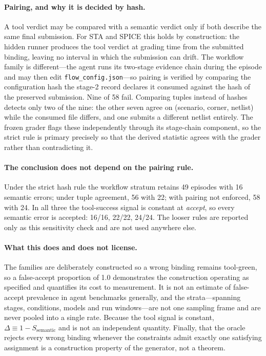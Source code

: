 \documentclass{article}
\begin{document}
\paragraph{Pairing, and why it is decided by hash.} A tool verdict may be compared with a semantic verdict only if both describe the same final submission. For STA and SPICE this holds by construction: the hidden runner produces the tool verdict at grading time from the submitted binding, leaving no interval in which the submission can drift. The workflow family is different---the agent runs its two-stage evidence chain during the episode and may then edit \texttt{flow\_config.json}---so pairing is verified by comparing the configuration hash the stage-2 record declares it consumed against the hash of the preserved submission. Nine of 58 fail. Comparing tuples instead of hashes detects only two of the nine: the other seven agree on (scenario, corner, netlist) while the consumed file differs, and one submits a different netlist entirely. The frozen grader flags these independently through its stage-chain component, so the strict rule is primary precisely so that the derived statistic agrees with the grader rather than contradicting it.

\paragraph{The conclusion does not depend on the pairing rule.} Under the strict hash rule the workflow stratum retains 49 episodes with 16 semantic errors; under tuple agreement, 56 with 22; with pairing not enforced, 58 with 24. In all three the tool-success signal is constant at \emph{accept}, so every semantic error is accepted: 16/16, 22/22, 24/24. The looser rules are reported only as this sensitivity check and are not used anywhere else.

\paragraph{What this does and does not license.} The families are deliberately constructed so a wrong binding remains tool-green, so a false-accept proportion of 1.0 demonstrates the construction operating as specified and quantifies its cost to measurement. It is not an estimate of false-accept prevalence in agent benchmarks generally, and the strata---spanning stages, conditions, models and run windows---are not one sampling frame and are never pooled into a single rate. Because the tool signal is constant, $\Delta \equiv 1-S_{\text{semantic}}$ and is not an independent quantity. Finally, that the oracle rejects every wrong binding whenever the constraints admit exactly one satisfying assignment is a construction property of the generator, not a theorem.
\end{document}
